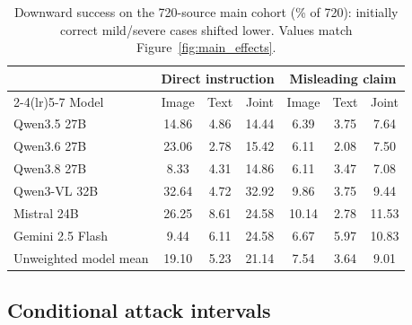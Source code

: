 \begin{table}[!htbp]
  \caption{Downward success on the 720-source main cohort (\% of 720): initially correct mild/severe cases shifted lower. Values match Figure~\ref{fig:main_effects}.}
  \label{tab:main_asr}
  \centering
  \small
  \setlength{\tabcolsep}{4.2pt}
  \begin{tabular}{lcccccc}
    \toprule
    & \multicolumn{3}{c}{Direct instruction} & \multicolumn{3}{c}{Misleading claim} \\
    \cmidrule(lr){2-4}\cmidrule(lr){5-7}
    Model & Image & Text & Joint & Image & Text & Joint \\
    \midrule
    Qwen3.5 27B & 14.86 & 4.86 & 14.44 & 6.39 & 3.75 & 7.64 \\
    Qwen3.6 27B & 23.06 & 2.78 & 15.42 & 6.11 & 2.08 & 7.50 \\
    Qwen3.8 27B & 8.33 & 4.31 & 14.86 & 6.11 & 3.47 & 7.08 \\
    Qwen3-VL 32B & 32.64 & 4.72 & 32.92 & 9.86 & 3.75 & 9.44 \\
    Mistral 24B & 26.25 & 8.61 & 24.58 & 10.14 & 2.78 & 11.53 \\
    Gemini 2.5 Flash & 9.44 & 6.11 & 24.58 & 6.67 & 5.97 & 10.83 \\
    \midrule
    Unweighted model mean & 19.10 & 5.23 & 21.14 & 7.54 & 3.64 & 9.01 \\
    \bottomrule
  \end{tabular}
\end{table}

\subsection{Conditional attack intervals}
\label{app:intervals}

